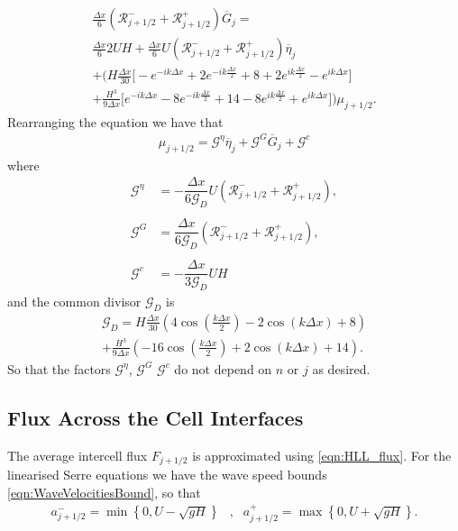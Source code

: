 \begin{multline*}
\frac{\Delta x}{6} \left(\mathcal{R}^-_{j +1/2} + \mathcal{R}^+_{j +1/2} \right) \overline{G}_j =  \\
\frac{\Delta x}{6} 2UH   + \frac{\Delta x}{6} U \left(\mathcal{R}^-_{j +1/2} + \mathcal{R}^+_{j +1/2} \right) \overline{\eta}_j\\ +   \Bigg(H\frac{\Delta x}{30} \Bigg[ -e^{-ik\Delta x } +  2 e^{-ik\frac{\Delta x}{2}}  + 8 + 2 e^{ik\frac{\Delta x}{2}} - e^{ik{\Delta x}}  \Bigg]   \\ + \frac{H^3 }{9\Delta x} \Bigg[  e^{-ik{\Delta x}} -8e^{-ik\frac{\Delta x}{2}} + 14  - 8 e^{ik\frac{\Delta x}{2}} + e^{ik{\Delta x}}  \Bigg]    \Bigg) \mu_{j+1/2}. 
\end{multline*}
Rearranging the equation we have that
\begin{align}
\label{eqn:2ndFEMutoG}
\mu_{j+1/2} =  \mathcal{G}^{\eta} \overline{\eta}_{j} + \mathcal{G}^G \overline{G}_{j} + \mathcal{G}^c 
\end{align}
where
\begin{align*}
\mathcal{G}^\eta &=  -\dfrac{\Delta x}{6\mathcal{G}_D } U \left(\mathcal{R}^-_{j +1/2} + \mathcal{R}^+_{j +1/2} \right), \\ \\
\mathcal{G}^G &= \dfrac{\Delta x}{6\mathcal{G}_D } \left(\mathcal{R}^-_{j +1/2} + \mathcal{R}^+_{j +1/2} \right), \\ \\
\mathcal{G}^c &=  -\dfrac{\Delta x}{3\mathcal{G}_D }UH
\end{align*}
and the common divisor $\mathcal{G}_D$ is
\begin{multline*}
\mathcal{G}_D = H\frac{\Delta x}{30} \left(4\cos\left(\frac{k \Delta x}{2}\right) - 2\cos\left({k \Delta x}\right) + 8\right) \\ + \frac{H^3 }{9\Delta x}\left(-16\cos\left(\frac{k\Delta x}{2}\right) + 2 \cos\left(k \Delta x\right) + 14\right).
\end{multline*}
So that the factors $\mathcal{G}^\eta$, $\mathcal{G}^G$ $\mathcal{G}^c$ do not depend on $n$ or $j$ as desired.

\subsection{Flux Across the Cell Interfaces}
The average intercell flux $F_{j+1/2}$ is approximated using \eqref{eqn:HLL_flux}. For the linearised Serre equations we have the wave speed bounds \eqref{eqn:WaveVelocitiesBound}, so that
\begin{align}
a^-_{j+ 1/2} = \min \left\lbrace 0,  U - \sqrt{g H} \right \rbrace&, &a^+_{j+ 1/2} =  \max \left\lbrace 0, U + \sqrt{g H} \right \rbrace .
\label{eqn:wavespeedboundslinSerre}
\end{align}

